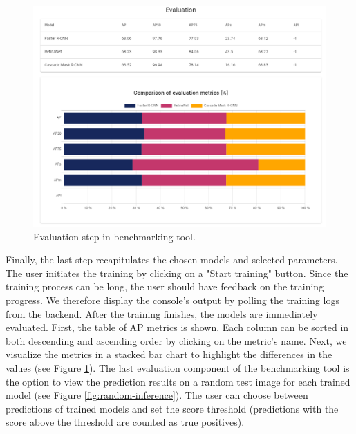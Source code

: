 \begin{figure}[ht]
    \includegraphics[width=\linewidth]{Sources/Figures/eval_table_plot.png}
    \caption{Evaluation step in benchmarking tool.}
    \label{fig:evaluation-step}
\end{figure}

Finally, the last step recapitulates the chosen models and selected parameters.
The user initiates the training by clicking on a "Start training" button. Since
the training process can be long, the user should have feedback on the training
progress. We therefore display the console's output by polling the training logs
from the backend. After the training finishes, the models are immediately
evaluated. First, the table of AP metrics is shown. Each column can be sorted in
both descending and ascending order by clicking on the metric's name. Next, we
visualize the metrics in a stacked bar chart to highlight the differences in the
values (see Figure \ref{fig:evaluation-step}). The last evaluation component of
the benchmarking tool is the option to view the prediction results on a random
test image for each trained model (see Figure \ref{fig:random-inference}). The
user can choose between predictions of trained models and set the score
threshold (predictions with the score above the threshold are counted as
true positives).

